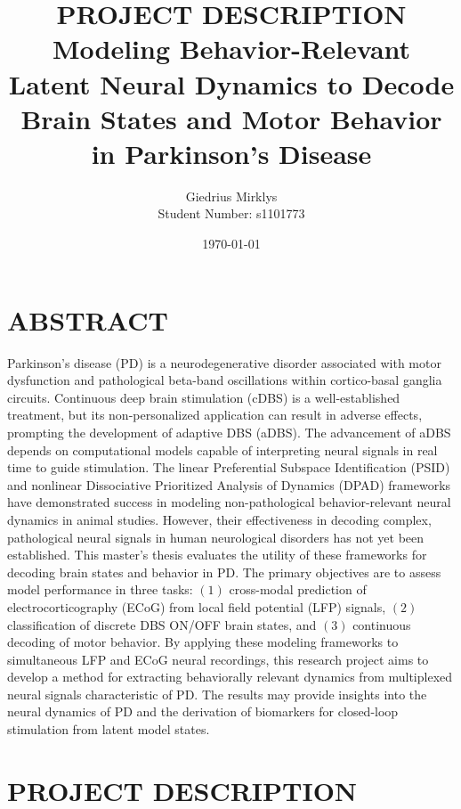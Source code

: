 \documentclass[12pt, letterpaper]{article}
\begin{document}
\title{\textbf{PROJECT DESCRIPTION} \\ \vspace{1.5em} \large Modeling Behavior-Relevant Latent Neural Dynamics to Decode Brain States and Motor Behavior in Parkinson’s Disease}
\author{Giedrius Mirklys \\
    \normalsize{Student Number: s1101773}}
\date{\today} %

\maketitle
\RaggedRight


\section{ABSTRACT}
Parkinson’s disease (PD) is a neurodegenerative disorder associated with motor dysfunction and pathological beta-band oscillations within cortico-basal ganglia circuits. Continuous deep brain stimulation (cDBS) is a well-established treatment, but its non-personalized application can result in adverse effects, prompting the development of adaptive DBS (aDBS). The advancement of aDBS depends on computational models capable of interpreting neural signals in real time to guide stimulation. The linear Preferential Subspace Identification (PSID) and nonlinear Dissociative Prioritized Analysis of Dynamics (DPAD) frameworks have demonstrated success in modeling non-pathological behavior-relevant neural dynamics in animal studies. However, their effectiveness in decoding complex, pathological neural signals in human neurological disorders has not yet been established. This master’s thesis evaluates the utility of these frameworks for decoding brain states and behavior in PD. The primary objectives are to assess model performance in three tasks: $(1)$ cross-modal prediction of electrocorticography (ECoG) from local field potential (LFP) signals, $(2)$ classification of discrete DBS ON/OFF brain states, and $(3)$ continuous decoding of motor behavior. By applying these modeling frameworks to simultaneous LFP and ECoG neural recordings, this research project aims to develop a method for extracting behaviorally relevant dynamics from multiplexed neural signals characteristic of PD. The results may provide insights into the neural dynamics of PD and the derivation of biomarkers for closed-loop stimulation from latent model states.

\section{PROJECT DESCRIPTION}
\end{document}
